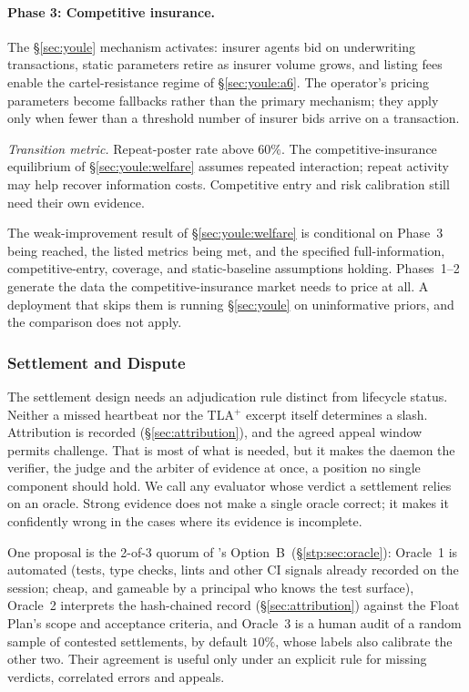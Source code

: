 \documentclass[11pt,a4paper]{article}
\theoremstyle{definition}
\theoremstyle{remark}
\begin{document}
\paragraph{Phase 3: Competitive insurance.}
The \S\ref{sec:youle} mechanism activates: insurer agents bid on underwriting transactions, static parameters retire as insurer volume grows, and listing fees enable the cartel-resistance regime of \S\ref{sec:youle:a6}. The operator's pricing parameters become fallbacks rather than the primary mechanism; they apply only when fewer than a threshold number of insurer bids arrive on a transaction.

\emph{Transition metric.} Repeat-poster rate above $60\%$. The competitive-insurance equilibrium of \S\ref{sec:youle:welfare} assumes repeated interaction; repeat activity may help recover information costs.
Competitive entry and risk calibration still need their own evidence.

\medskip

The weak-improvement result of \S\ref{sec:youle:welfare} is conditional on Phase~3 being reached, the listed metrics being met, and the specified full-information, competitive-entry, coverage, and static-baseline assumptions holding. Phases~1--2 generate the data the competitive-insurance market needs to price at all. A deployment that skips them is running \S\ref{sec:youle} on uninformative priors, and the comparison does not apply.

\subsubsection{Settlement and Dispute}\label{sec:pricing:settlement}

The settlement design needs an adjudication rule distinct from lifecycle
status. Neither a missed heartbeat nor the TLA$^{+}$ excerpt itself determines
a slash. Attribution is recorded (\S\ref{sec:attribution}), and the agreed
appeal window permits challenge. That is most of what is needed, but it makes the daemon the verifier, the judge and the arbiter of evidence at once, a position no single component should hold. We call any evaluator whose verdict a settlement relies on an oracle. Strong evidence does not make a single oracle correct; it makes it confidently wrong in the cases where its evidence is incomplete.

One proposal is the 2-of-3 quorum of 's
Option~B\ifpdbook\ (\S\ref{stp:sec:oracle})\fi: Oracle~1 is automated (tests,
type checks, lints and other CI signals already recorded on the session;
cheap, and gameable by a principal who knows the test surface), Oracle~2
interprets the hash-chained record (\S\ref{sec:attribution}) against the
Float Plan's scope and acceptance criteria, and Oracle~3 is a human audit of
a random sample of contested settlements, by default $10\%$, whose labels
also calibrate the other two. Their agreement is useful only under an
explicit rule for missing verdicts, correlated errors and appeals.
\end{document}
